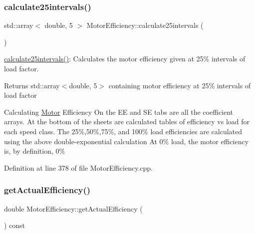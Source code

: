 \mbox{\label{class_motor_efficiency_a4135d26efe506365d9ecb7c15f43f35d}} 
\subsubsection{\texorpdfstring{calculate25intervals()}{calculate25intervals()}}
{\footnotesize\ttfamily std\+::array$<$ double, 5 $>$ Motor\+Efficiency\+::calculate25intervals (\begin{DoxyParamCaption}{ }\end{DoxyParamCaption})}

\hyperlink{class_motor_efficiency_a4135d26efe506365d9ecb7c15f43f35d}{calculate25intervals()}\+: Calculates the motor efficiency given at 25\% intervals of load factor. \begin{DoxyReturn}{Returns}
std\+::array$<$double, 5$>$ containing motor efficiency at 25\% intervals of load factor 
\end{DoxyReturn}
Calculating \hyperlink{class_motor}{Motor} Efficiency On the EE and SE tabs are all the coefficient arrays. At the bottom of the sheets are calculated tables of efficiency vs load for each speed class. The 25\%,50\%,75\%, and 100\% load efficiencies are calculated using the above double-\/exponential calculation At 0\% load, the motor efficiency is, by definition, 0\%

Definition at line 378 of file Motor\+Efficiency.\+cpp.

\mbox{\label{class_motor_efficiency_ae40031307b8631cf40df1c4069069dc0}} 
\subsubsection{\texorpdfstring{get\+Actual\+Efficiency()}{getActualEfficiency()}}
{\footnotesize\ttfamily double Motor\+Efficiency\+::get\+Actual\+Efficiency (\begin{DoxyParamCaption}{ }\end{DoxyParamCaption}) const\hspace{0.3cm}{\ttfamily [inline]}}

